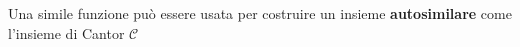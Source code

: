 \documentclass[preview]{standalone}
\begin{document}
\begin{center}
\begin{minipage}{5cm} \centering
                Una simile funzione può essere usata
                per costruire un insieme \textbf{autosimilare}
                come l'insieme di Cantor $\mathcal{C}$
            \end{minipage}
\end{center}
\end{document}
